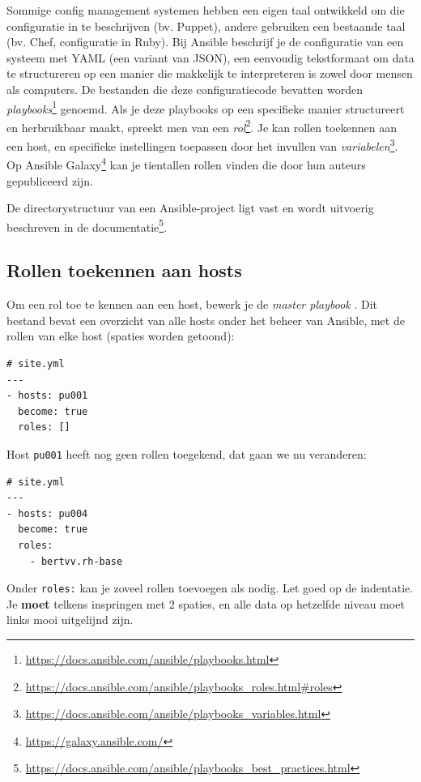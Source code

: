 Sommige config management systemen hebben een eigen taal ontwikkeld om die configuratie in te beschrijven (bv. Puppet), andere gebruiken een bestaande taal (bv. Chef, configuratie in Ruby). Bij Ansible beschrijf je de configuratie van een systeem met YAML (een variant van JSON), een eenvoudig tekstformaat om data te structureren op een manier die makkelijk te interpreteren is zowel door mensen als computers. De bestanden die deze configuratiecode bevatten worden \emph{playbooks}\footnote{\url{https://docs.ansible.com/ansible/playbooks.html}} genoemd. Als je deze playbooks op een specifieke manier structureert en herbruikbaar maakt, spreekt men van een \emph{rol}\footnote{\url{https://docs.ansible.com/ansible/playbooks_roles.html\#roles}}. Je kan rollen toekennen aan een host, en specifieke instellingen toepassen door het invullen van \emph{variabelen}\footnote{\url{https://docs.ansible.com/ansible/playbooks_variables.html}}. Op Ansible Galaxy\footnote{\url{https://galaxy.ansible.com/}} kan je tientallen rollen vinden die door hun auteurs gepubliceerd zijn.

De directorystructuur van een Ansible-project ligt vast en wordt uitvoerig beschreven in de documentatie\footnote{\url{https://docs.ansible.com/ansible/playbooks_best_practices.html}}.

\subsection{Rollen toekennen aan hosts}
\label{sub:rollen-toekennen-aan-hosts}

Om een rol toe te kennen aan een host, bewerk je de \emph{master playbook} . Dit bestand bevat een overzicht van alle hosts onder het beheer van Ansible, met de rollen van elke host (spaties worden getoond):

\begin{verbatim}
# site.yml
---
- hosts: pu001
  become: true
  roles: []
\end{verbatim}

Host \texttt{pu001} heeft nog geen rollen toegekend, dat gaan we nu veranderen:

\begin{verbatim}
# site.yml
---
- hosts: pu004
  become: true
  roles:
    - bertvv.rh-base
\end{verbatim}

Onder \texttt{roles:} kan je zoveel rollen toevoegen als nodig. Let goed op de indentatie. Je \textbf{moet} telkens inspringen met 2 spaties, en alle data op hetzelfde niveau moet links mooi uitgelijnd zijn.

